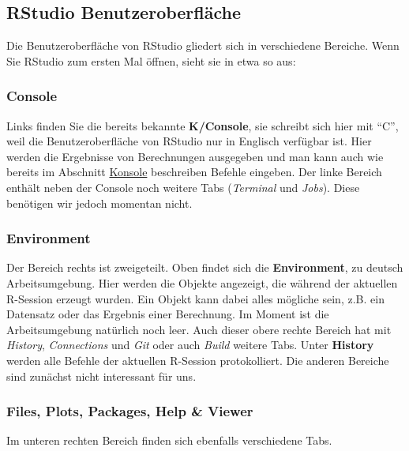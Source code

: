 \documentclass[
]{book}
\begin{document}
\hypertarget{rstudio-benutzeroberfluxe4che}{%
\subsection{RStudio Benutzeroberfläche}\label{rstudio-benutzeroberfluxe4che}}

Die Benutzeroberfläche von RStudio gliedert sich in verschiedene Bereiche.
Wenn Sie RStudio zum ersten Mal öffnen, sieht sie in etwa so aus:

\hypertarget{console}{%
\subsubsection{Console}\label{console}}

Links finden Sie die bereits bekannte \textbf{K/Console}, sie schreibt sich hier mit ``C'', weil die Benutzeroberfläche von RStudio nur in Englisch verfügbar ist. Hier werden die Ergebnisse von Berechnungen ausgegeben und man kann auch wie bereits im Abschnitt \protect\hyperlink{konsole}{Konsole} beschreiben Befehle eingeben. Der linke Bereich enthält neben der Console noch weitere Tabs (\emph{Terminal} und \emph{Jobs}). Diese benötigen wir jedoch momentan nicht.

\hypertarget{environment}{%
\subsubsection{Environment}\label{environment}}

Der Bereich rechts ist zweigeteilt. Oben findet sich die \textbf{Environment}, zu deutsch Arbeitsumgebung.
Hier werden die Objekte angezeigt, die während der aktuellen R-Session erzeugt wurden. Ein Objekt kann dabei alles mögliche sein, z.B. ein Datensatz oder das Ergebnis einer Berechnung. Im Moment ist die Arbeitsumgebung natürlich noch leer. Auch dieser obere rechte Bereich hat mit \emph{History}, \emph{Connections} und \emph{Git} oder auch \emph{Build} weitere Tabs. Unter \textbf{History} werden alle Befehle der aktuellen R-Session protokolliert. Die anderen Bereiche sind zunächst nicht interessant für uns.

\hypertarget{files-plots-packages-help-viewer}{%
\subsubsection{Files, Plots, Packages, Help \& Viewer}\label{files-plots-packages-help-viewer}}

Im unteren rechten Bereich finden sich ebenfalls verschiedene Tabs.
\end{document}
